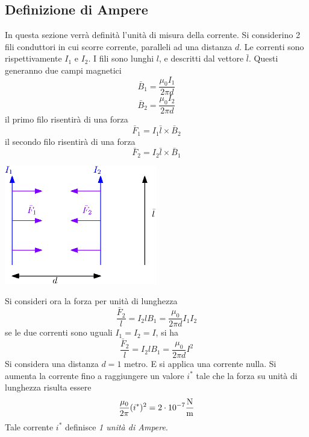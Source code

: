 \documentclass[10pt, letterpaper]{report}
\begin{document}
\subsection{Definizione di Ampere}
In questa sezione verrà definità l'unità di misura della corrente. Si considerino 2 fili conduttori in cui scorre corrente, paralleli ad una distanza $d$. Le correnti sono rispettivamente $I_1$ e $I_2$. I fili sono lunghi $l$, e descritti dal vettore $\bar l$.\acc 
Questi generanno due campi magnetici 
$$ \bar B_1=\frac{\mu_0I_1}{2\pi d}$$
$$ \bar B_2=\frac{\mu_0I_2}{2\pi d}$$
il primo filo risentirà di una forza 
$$ \bar F_1=I_1\bar l \times \bar B_2$$
il secondo filo risentirà di una forza 
$$ \bar F_2=I_2\bar l \times \bar B_1$$
\begin{center}
    \includegraphics[width=0.5\textwidth ]{images/AmpereDef.eps}
\end{center}
Si consideri ora la forza per unità di lunghezza 
$$ \frac{\bar F_2}{l}=I_2lB_1=\frac{\mu_0}{2\pi d}I_1 I_2$$
se le due correnti sono uguali $I_1=I_2=I$, si ha 
$$ \frac{\bar F_2}{l}=I_2lB_1=\frac{\mu_0}{2\pi d}I^2 $$
Si considera una distanza $d=1$ metro. E si applica una corrente nulla. Si aumenta la corrente fino a raggiungere un valore $i^*$ tale che la forza su unità di lunghezza risulta essere 
$$ \frac{\mu_0}{2\pi}(i^*)^2=2\cdot 10^{-7} \frac{\text N}{\text m} $$
Tale corrente $i^*$
 definisce \textit{1 unità di Ampere}.
 \flowerLine 
\end{document}
